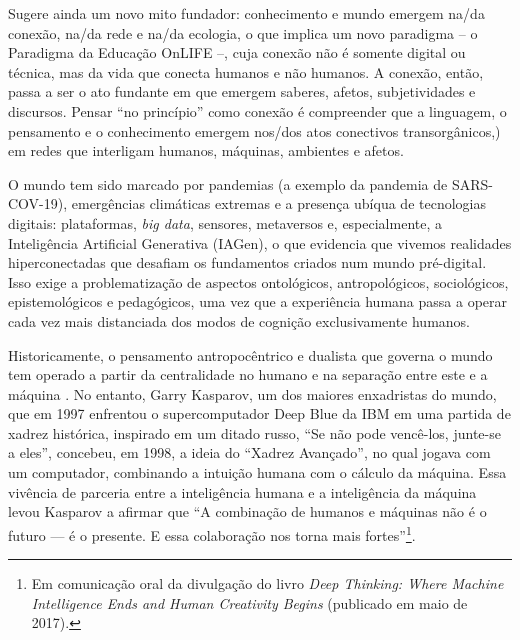 \documentclass[portuguese]{textolivre}
\begin{document}
Sugere ainda um novo mito fundador: conhecimento e mundo emergem na/da conexão, na/da rede e na/da ecologia, o que implica um novo paradigma – o Paradigma da Educação OnLIFE –\cite{schlemmer2020ecossistemas,moreira2020educacaodigital,schlemmer2020ampliando,schlemmer2020onlife,schlemmer2024inteligencias}, cuja conexão não é somente digital ou técnica, mas da vida que conecta humanos e não humanos. A conexão, então, passa a ser o ato fundante em que emergem saberes, afetos, subjetividades e discursos. Pensar “no princípio” como conexão é compreender que a linguagem, o pensamento e o conhecimento emergem nos/dos atos conectivos transorgânicos,) \cite{difelice2017netativismo} em redes que interligam humanos, máquinas, ambientes e afetos.

O mundo tem sido marcado por pandemias (a exemplo da pandemia de SARS-COV-19), emergências climáticas extremas e a presença ubíqua de tecnologias digitais: plataformas, \textit{big data}, sensores, metaversos e, especialmente, a Inteligência Artificial Generativa (IAGen), o que evidencia que vivemos realidades hiperconectadas que desafiam os fundamentos criados num mundo pré-digital. Isso exige a problematização de aspectos ontológicos, antropológicos, sociológicos, epistemológicos e pedagógicos, uma vez que a experiência humana passa a operar cada vez mais distanciada dos modos de cognição exclusivamente humanos.

Historicamente, o pensamento antropocêntrico e dualista que governa o mundo tem operado a partir da centralidade no humano e na separação entre este e a máquina \cite{serres1993filosofiamestica,latour2012reagregando}. No entanto, Garry Kasparov, um dos maiores enxadristas do mundo, que em 1997 enfrentou o supercomputador Deep Blue da IBM em uma partida de xadrez histórica, inspirado em um ditado russo, “Se não pode vencê-los, junte-se a eles”, concebeu, em 1998, a ideia do “Xadrez Avançado”, no qual jogava com um computador, combinando a intuição humana com o cálculo da máquina. Essa vivência de parceria entre a inteligência humana e a inteligência da máquina levou Kasparov a afirmar que “A combinação de humanos e máquinas não é o futuro — é o presente. E essa colaboração nos torna mais fortes”\footnote{Em comunicação oral da divulgação do livro \textit{Deep Thinking: Where Machine Intelligence Ends and Human Creativity Begins} (publicado em maio de 2017).}.
\end{document}
